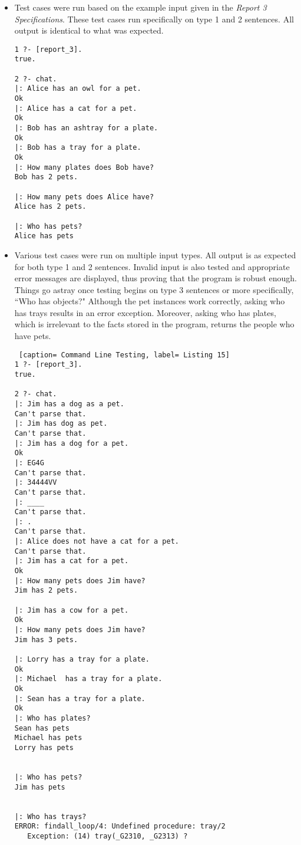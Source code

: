 \documentclass[11pt]{article}
\begin{document}
\begin{itemize}
\item
Test cases were run based on the example input given in the \emph{Report 3 Specifications}. These test cases run specifically on type 1 and 2 sentences. All output is identical to what was expected.

\begin{lstlisting}[caption= Command Line Testing, label= Listing 14]
1 ?- [report_3].
true.

2 ?- chat.
|: Alice has an owl for a pet.
Ok
|: Alice has a cat for a pet.
Ok
|: Bob has an ashtray for a plate.
Ok
|: Bob has a tray for a plate.
Ok
|: How many plates does Bob have?
Bob has 2 pets.

|: How many pets does Alice have?
Alice has 2 pets.

|: Who has pets?
Alice has pets				
\end{lstlisting}

\item
Various test cases were run on multiple input types. All output is as expected for both type 1 and 2 sentences. Invalid input is also tested and appropriate error messages are displayed, thus proving that the program is robust enough. Things go astray once testing begins on type 3 sentences or more specifically, ``Who has objects?" Although the pet instances work correctly, asking who has trays results in an error exception. Moreover, asking who has plates, which is irrelevant to the facts stored in the program, returns the people who have pets.
\begin{lstlisting} [caption= Command Line Testing, label= Listing 15]
1 ?- [report_3].
true.

2 ?- chat.
|: Jim has a dog as a pet.
Can't parse that.
|: Jim has dog as pet.
Can't parse that.
|: Jim has a dog for a pet.
Ok
|: EG4G
Can't parse that.
|: 34444VV
Can't parse that.
|: ____
Can't parse that.
|: .
Can't parse that.
|: Alice does not have a cat for a pet.
Can't parse that.
|: Jim has a cat for a pet.
Ok
|: How many pets does Jim have?
Jim has 2 pets.

|: Jim has a cow for a pet.
Ok
|: How many pets does Jim have?
Jim has 3 pets.

|: Lorry has a tray for a plate.
Ok
|: Michael  has a tray for a plate.
Ok
|: Sean has a tray for a plate.
Ok
|: Who has plates?
Sean has pets
Michael has pets
Lorry has pets


|: Who has pets?
Jim has pets


|: Who has trays?
ERROR: findall_loop/4: Undefined procedure: tray/2
   Exception: (14) tray(_G2310, _G2313) ? 
\end{lstlisting}
\end{itemize}	
\end{document}
